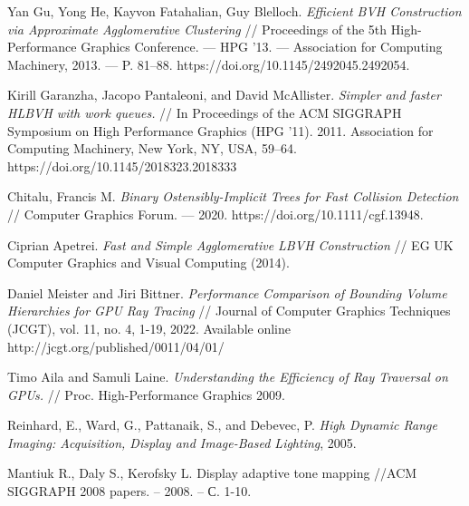 \documentclass[11pt,fleqn,english,russian]{report} %
\begin{document}
\begin{thebibliography}{10}
	 Yan Gu, Yong He, Kayvon Fatahalian, Guy Blelloch. \textit{Efficient BVH Construction via Approximate Agglomerative Clustering} // Proceedings of the 5th High-Performance Graphics Conference. — HPG ’13. — Association for Computing Machinery, 2013. — P. 81–88. https://doi.org/10.1145/2492045.2492054.
	
	 Kirill Garanzha, Jacopo Pantaleoni, and David McAllister. \textit{Simpler and faster HLBVH with work queues.} // In Proceedings of the ACM SIGGRAPH Symposium on High Performance Graphics (HPG '11). 2011. Association for Computing Machinery, New York, NY, USA, 59–64. https://doi.org/10.1145/2018323.2018333
	
	 Chitalu, Francis M. \textit{Binary Ostensibly-Implicit Trees for Fast Collision Detection} // Computer Graphics Forum. — 2020. https://doi.org/10.1111/cgf.13948.
	
	 Ciprian Apetrei. \textit{Fast and Simple Agglomerative LBVH Construction} // EG UK Computer Graphics and Visual Computing (2014).
	
	 Daniel Meister and Jiri Bittner. \textit{Performance Comparison of Bounding Volume Hierarchies for GPU Ray Tracing} // Journal of Computer Graphics Techniques (JCGT), vol. 11, no. 4, 1-19, 2022. Available online http://jcgt.org/published/0011/04/01/
	
	 Timo Aila and Samuli Laine. \textit{Understanding the Efficiency of Ray Traversal on GPUs.} // Proc. High-Performance Graphics 2009.
	
	 Reinhard, E., Ward, G., Pattanaik, S., and Debevec, P. \textit{High Dynamic Range Imaging: Acquisition, Display and Image-Based Lighting}, 2005.
	
	 Mantiuk R., Daly S., Kerofsky L. Display adaptive tone mapping //ACM SIGGRAPH 2008 papers. – 2008. – С. 1-10.
	
\end{thebibliography}
\end{document}
